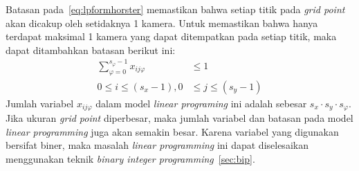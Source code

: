 Batasan pada~\ref{eq:lpformhorster} memastikan bahwa setiap titik pada \textit{grid point} akan dicakup oleh setidaknya 1 kamera. Untuk memastikan bahwa hanya terdapat maksimal 1 kamera yang dapat ditempatkan pada setiap titik, maka dapat ditambahkan batasan berikut ini:
\begin{equation}
	\begin{split}
		\sum_{\varphi=0}^{s_\varphi-1}x_{ij\varphi}&\leq 1\\
		0\leq i\leq(s_x-1), 0&\leq j\leq(s_y-1)
	\end{split}
\end{equation}
Jumlah variabel \(x_{ij\varphi}\) dalam model \textit{linear programing} ini adalah sebesar \(s_x\cdot s_y\cdot s_\varphi\). Jika ukuran \textit{grid point} diperbesar, maka jumlah variabel dan batasan pada model \textit{linear programming} juga akan semakin besar. Karena variabel yang digunakan bersifat biner, maka masalah \textit{linear programming} ini dapat diselesaikan menggunakan teknik \textit{binary integer programming}~\ref{sec:bip}.